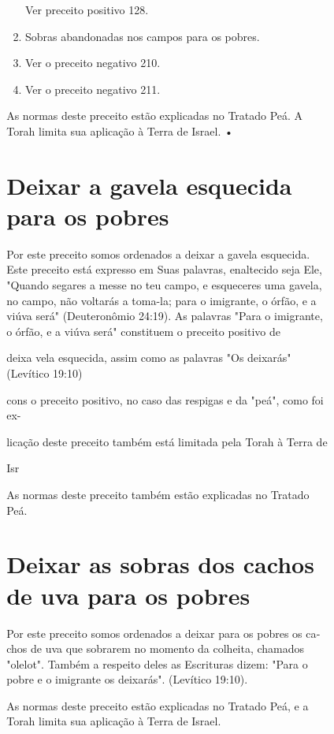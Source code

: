 \begin{itemize}
\begin{enumrate}
\begin{itemize}
\begin{itemize}
\begin{itemize}
\begin{enumerate}
 Ver preceito positivo 128.
 
\item
 
 Sobras abandonadas nos campos para os pobres.
 
\item
 
 Ver o preceito negativo 210.
 
\item
 
 Ver o preceito negativo 211.
 
\end{enumerate}

As normas deste preceito estão explicadas no Tratado Peá. A Torah limita
sua aplicação à Terra de Israel. •

\section{Deixar a gavela esquecida para os pobres}

Por este preceito somos ordenados a deixar a gavela esquecida. Este
preceito está expresso em Suas palavras, enaltecido seja Ele, "Quando
segares a messe no teu campo, e esqueceres uma gavela, no campo, não
voltarás a toma-la; para o imigrante, o órfão, e a viúva será"
(Deuteronômio 24:19). As palavras "Para o imigrante, o órfão, e a viúva
será" constituem o preceito positivo de

deixa vela esquecida, assim como as palavras "Os deixarás" (Levítico
19:10)

cons o preceito positivo, no caso das respigas e da "peá", como foi ex-


licação deste preceito também está limitada pela Torah à Terra de

Isr

As normas deste preceito também estão explicadas no Tratado Peá.


\section{Deixar as sobras dos cachos de uva para os pobres}

Por este preceito somos ordenados a deixar para os pobres os ca­chos de
uva que sobrarem no momento da colheita, chamados "olelot". Tam­bém a
respeito deles as Escrituras dizem: "Para o pobre e o imigrante os
deixa­rás". (Levítico 19:10).

As normas deste preceito estão explicadas no Tratado Peá, e a Torah
limita sua aplicação à Terra de Israel.


\end{itemize}
\end{itemize}
\end{itemize}
\end{enumrate}
\end{itemize}
